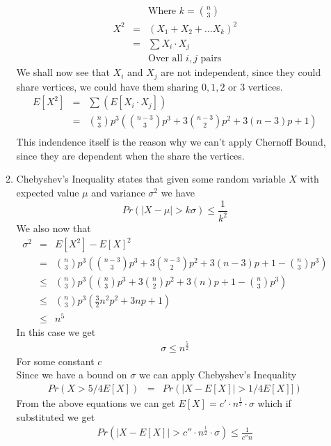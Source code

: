 \documentclass{assignment}
\begin{document}
\begin{problemlist}
\begin{problem}
\begin{answer}
\begin{enumerate}
\begin{enumerate}
\begin{eqnarray}
& & \text{Where $k=\binom{n}{3}$} \nonumber \\
X^2 & = & (X_1 + X_2 + \ldots X_k)^2 \\
& = & \sum X_i \cdot X_j \\
& & \text{Over all $i,j$ pairs} \nonumber
\end{eqnarray}
We shall now see that $X_i$ and $X_j$ are not independent, since they could share vertices, we could have them sharing $0,1,2$ or $3$ vertices. 
\begin{eqnarray}
E[X^2] & = &  \sum (E[X_i \cdot X_j]) \\
& = & \binom{n}{3} p^3 ( \binom{n-3}{3} p^3 + 3 \binom{n-3}{2} p^2 + 3(n-3)p + 1) \\
\end{eqnarray}
This indendence itself is the reason why we can't apply Chernoff Bound, since they are dependent when the share the vertices. 
\item Chebyshev's Inequality states that given some random variable $X$ with expected value $\mu$ and variance $\sigma^2$ we have
\begin{equation}
Pr( |X-\mu| > k\sigma ) \leq \frac{1}{k^2}
\end{equation} 
We also now that 
\begin{eqnarray}
 \sigma^2 & = & E[X^2] - E[X]^2 \\
 & =  & \binom{n}{3} p^3 ( \binom{n-3}{3} p^3 + 3 \binom{n-3}{2} p^2 + 3(n-3)p + 1 - \binom{n}{3}p^3) \\
& \leq & \binom{n}{3} p^3 ( \binom{n}{3} p^3 + 3 \binom{n}{2} p^2 + 3(n)p + 1 - \binom{n}{3}p^3)\\
& \leq &  \binom{n}{3} p^3 (\frac{3}{2}n^2p^2 + 3np + 1) \\
& \leq & n^5 
\end{eqnarray}
In this case we get 
\begin{eqnarray}
\sigma \leq  n^\frac{5}{2} 
\end{eqnarray}
For some constant $c$ \\
Since we have a bound on $\sigma$ we can apply Chebyshev's Inequality
\begin{eqnarray}
 Pr (X > 5/4 E[X]) & = & Pr(|X-E[X]|> 1/4 E[X]])
\end{eqnarray}
From the above equations we can get $E[X] = c' \cdot n^{\frac{1}{2}} \cdot \sigma$ which if substituted we get
\begin{eqnarray}
Pr(|X-E[X]|> c'' \cdot n^{\frac{1}{2}} \cdot \sigma) \leq \frac{1}{c'' n}
\end{eqnarray}

\end{enumerate}
\end{enumerate}
\end{answer}
\end{problem}
\end{problemlist}
\end{document}
